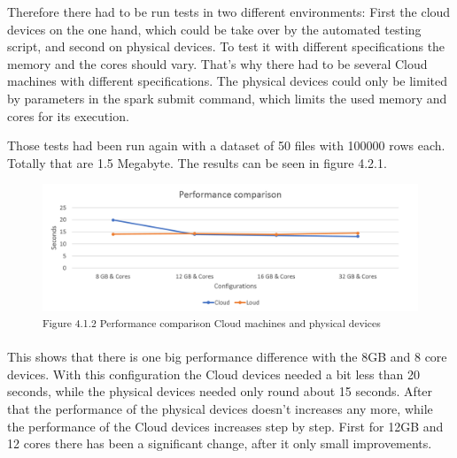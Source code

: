 Therefore there had to be run tests in two different environments: First the cloud devices on the one hand, which could be take over by the automated testing script, and second on physical devices. To test it with different specifications the memory and the cores should vary. That's why there had to be several Cloud machines with different specifications. The physical devices could only be limited by parameters in the spark submit command, which limits the used memory and cores for its execution.

Those tests had been run again with a dataset of 50 files with 100000 rows each. Totally that are 1.5 Megabyte. The results can be seen in figure 4.2.1.

\begin{figure}[h]
\centering
\includegraphics[width=\textwidth]{images/performance_comparison.png}
\textsuperscript{Figure 4.1.2 Performance comparison Cloud machines and physical devices}
\end{figure}

This shows that there is one big performance difference with the 8GB and 8 core devices. With this configuration the Cloud devices needed a bit less than 20 seconds, while the physical devices needed only round about 15 seconds. After that the performance of the physical devices doesn't increases any more, while the performance of the Cloud devices increases step by step. First for 12GB and 12 cores there has been a significant change, after it only small improvements.